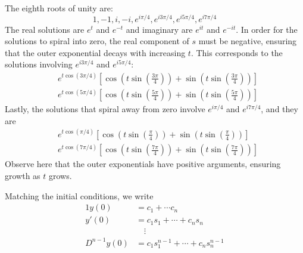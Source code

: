 \documentclass[a4paper]{article}
\begin{document}
The eighth roots of unity are:
\[
	1, -1, i, -i, e^{i \pi / 4}, e^{i 3 \pi / 4}, e^{i 5 \pi / 4}, e^{i 7 \pi / 4} 
\]
The real solutions are \( e^{t } \) and \( e^{-t } \) and imaginary are \( e^{it } \) and \( e^{-it } \). In order for the solutions to spiral into zero, the real component of \( s  \) must be negative, ensuring that the outer exponential decays with increasing \( t  \). This corresponds to the solutions involving \( e^{i 3 \pi / 4} \) and \( e^{i 5 \pi / 4} \):
\begin{align*}
	& e^{t \cos\!\left( 3 \pi / 4 \right)} \!\left[ \cos\!\left( t \sin\!\left( \frac{3 \pi }{4} \right) \right) + \sin\!\left( t \sin\!\left( \frac{3 \pi }{4} \right) \right) \right] \\[12pt]
	& e^{t \cos\!\left( 5 \pi / 4 \right)} \!\left[ \cos\!\left( t \sin\!\left( \frac{5 \pi }{4} \right) \right) + \sin\!\left( t \sin\!\left( \frac{5 \pi }{4} \right) \right) \right] 
\end{align*}
Lastly, the solutions that spiral away from zero involve \( e^{i \pi / 4} \) and \( e^{i 7 \pi / 4} \), and they are
\begin{align*}
	& e^{t \cos\!\left( \pi / 4 \right)} \!\left[ \cos\!\left( t \sin\!\left( \frac{\pi }{4} \right) \right) + \sin\!\left( t \sin\!\left( \frac{\pi }{4} \right) \right) \right] \\[12pt]
	& e^{t \cos\!\left( 7 \pi / 4 \right)} \!\left[ \cos\!\left( t \sin\!\left( \frac{7 \pi }{4} \right) \right) + \sin\!\left( t \sin\!\left( \frac{7 \pi }{4} \right) \right) \right] 
\end{align*}
Observe here that the outer exponentials have positive arguments, ensuring growth as \( t  \) grows.

\vspace{12pt}


Matching the initial conditions, we write
\begin{alignat*}{1}
	 y \!\left( 0 \right) & = c_{1} + \cdots c_{n }  \\
	 y'\!\left( 0 \right) & = c_{1}s_{1} + \cdots + c_{n }s_{n } \\ 
			      & \quad \vdots \\
	 D^{n - 1}y \!\left( 0 \right) & = c_{1}s^{n - 1}_{1} + \cdots + c_{n }s^{n - 1}_{n}
\end{alignat*}
\end{document}
